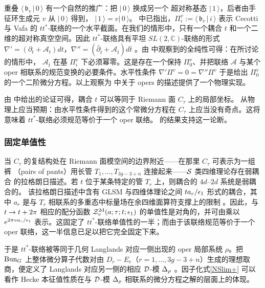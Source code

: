 重叠 $\langle\,\mathfrak{b}_v\,|\,0\,\rangle$ 有一个自然的推广：把 $|\,0\,\rangle$ 换成另一个
超对称基态 $|\,1\,\rangle$，后者由手征环生成元 $v$ 从 $|\,0\,\rangle$ 得到，
$|\,1\,\rangle= v|\,0\,\rangle$。\cite{HIV} 中已指出，$\Pi_i^v:=\langle\,\mathfrak{b}_v\,|\,i\,\rangle$
表示 Cecotti 与 Vafa \cite{CV} 的 $tt^*$-联络的一个水平截面。在我们的情形中，只有一个耦合
$t$ 和一个二维的超对称真空空间。因此 $tt^*$-联络具有平坦 $SL(2,\mathbb{C})$-联络的形式
$\nabla'=(\partial_t+\mathcal{A}_t)dt$，$\nabla''=(\bar\partial_{\bar{t}}+\mathcal{A}_{\bar{t}})d{\bar{t}}$
\cite{Ga09}。由 \cite{FKNO,HO,HR} 中观察到的全纯性可得：在所讨论的情形中，
$\mathcal{A}_{\bar{t}}$ 在基 $\Pi_i^v$ 下必须幂零。这是存在一个保持 $\Pi_0^v$、并把联络
$\mathcal{A}$ 与某个 oper 相联系的规范变换的必要条件。水平性条件
$\nabla' \Pi^v=0=\nabla''\Pi^v$ 于是给出 $\Pi_0^v$ 的一个二阶微分方程。以上观察为
\cite{DFKMMN} 中关于 opers 的描述提供了一个物理实现。

由 \cite{AGGTV} 中给出的论证可得，耦合 $t$ 可以等同于 Riemann 面 $C_\tau$ 上的局部坐标。
从物理上应当预期：由水平性条件得到的这个常微分方程在 $C_\tau$ 上应当没有奇点。这将意味着
$tt^*$-联络必须规范等价于一个 oper 联络。\cite{FKNO,HO,HR} 的结果支持这一论断。

\subsubsection{固定单值性}

当 $C_\tau$ 的复结构处在 Riemann 面模空间的边界附近——在那里 $C_\tau$ 可表示为一组裤
（pairs of pants）用长管 $T_1,\dots,T_{3g-3+n}$ 连接起来——$\mathcal{S}$ 类四维理论存在弱耦合
的拉格朗日描述。若 $t$ 位于某条特定的管 $T_r$ 上，则耦合的 $4d$–$2d$ 系统是弱耦合的。
该拉格朗日描述中含有 GLSM 与四维体理论之间 $ta_r/\epsilon_1$ 形式的耦合，其中 $a_r$ 是与 $T_r$
相联系的多重态中标量场在余四维面算符支撑上的限制 \cite{AGGTV}。因此，与 $t\to t+2\pi$
相应的配分函数 $\mathcal{Z}^{\rm 2d}_v(a;\tau;t;\epsilon_1)$ 的单值性是对角的，并可由乘以
$e^{2\pi va_r/\epsilon_1}$ 表示。这固定了 $tt^*$-联络单值性的一半；而由于该联络规范等价于一个
oper 联络，这一半信息已足以把它完全固定下来。

于是 $tt^*$-联络被等同于几何 Langlands 对应一侧出现的 oper 局部系统 $\rho$。把 ${\rm Bun}_G$
上整体微分算子代数对由 $D_r-E_r$（$r=1,\dots,3g-3+n$）生成的理想取商，便定义了 Langlands
对应另一侧的相应 $\mathcal{D}$-模 $\Delta_{\rho}$ \cite{Fr07}。因子化式\eqref{NSlim+} 可以看作 Hecke
本征值性质在与 $\mathcal{D}$-模 $\Delta_{\rho}$ 相联系的微分方程之解的层面上的体现。

